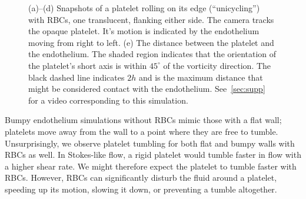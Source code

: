 \begin{figure}[th!]
    \vspace{11pt}

    \begin{subfigure}[t]{\textwidth}
    \end{subfigure}
    \caption[Platelet unicycling behavior]{%
(a)--(d) Snapshots of a platelet rolling on its edge (``unicycling'') with RBCs, one
translucent, flanking either side. The camera tracks the opaque platelet. It's motion is
indicated by the endothelium moving from right to left. (e) The distance between
the platelet and the endothelium. The shaded region indicates that the orientation of the
platelet's short axis is within $45^\circ$ of the vorticity direction.  The black dashed
line indicates $2h$ and is the maximum distance that might be considered contact with the
endothelium. See~\ref{sec:supp} for a video corresponding to this simulation.
    }\label{fig:unicycle}
\end{figure}

Bumpy endothelium simulations without RBCs mimic those with a flat wall; platelets move
away from the wall to a point where they are free to tumble. Unsurprisingly, we observe
platelet tumbling for both flat and bumpy walls with RBCs as well. In Stokes-like flow, a
rigid platelet would tumble faster in flow with a higher shear rate. We might therefore
expect the platelet to tumble faster with RBCs. However, RBCs can significantly disturb
the fluid around a platelet, speeding up its motion, slowing it down, or preventing a
tumble altogether.

